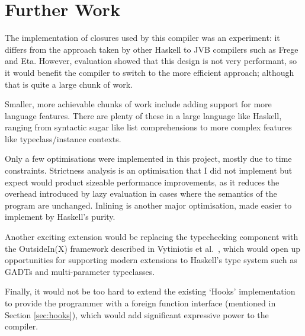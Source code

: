 \documentclass[dissertation.tex]{subfiles}
\begin{document}
\section{Further Work}
{
    The implementation of closures used by this compiler was an experiment: it differs from the approach taken by other Haskell to JVB compilers such as Frege and Eta. However, evaluation showed that this design is not very performant, so it would benefit the compiler to switch to the more efficient approach; although that is quite a large chunk of work.

    Smaller, more achievable chunks of work include adding support for more language features. There are plenty of these in a large language like Haskell, ranging from syntactic sugar like list comprehensions to more complex features like typeclass/instance contexts.

    Only a few optimisations were implemented in this project, mostly due to time constraints. Strictness analysis is an optimisation that I did not implement but expect would product sizeable performance improvements, as it reduces the overhead introduced by lazy evaluation in cases where the semantics of the program are unchanged. Inlining is another major optimisation, made easier to implement by Haskell's purity.

    Another exciting extension would be replacing the typechecking component with the OutsideIn(X) framework described in Vytiniotis et al.\ \cite{OutsideIn}, which would open up opportunities for supporting modern extensions to Haskell's type system such as GADTs and multi-parameter typeclasses. 

    Finally, it would not be too hard to extend the existing `Hooks' implementation to provide the programmer with a foreign function interface (mentioned in Section \ref{sec:hooks}), which would add significant expressive power to the compiler.
}
\end{document}
